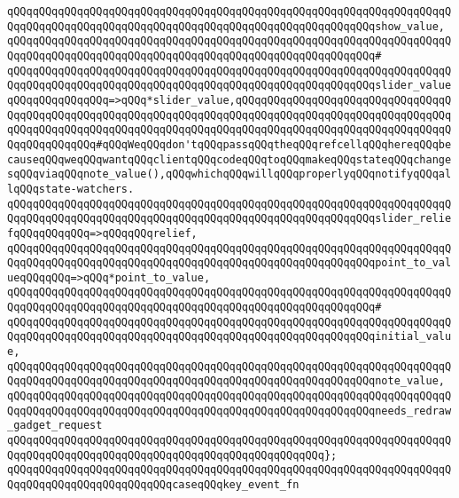 \verb|qQQqqQQqqQQqqQQqqQQqqQQqqQQqqQQqqQQqqQQqqQQqqQQqqQQqqQQqqQQqqQQqqQQqqQQqqQQqqQQqqQQqqQQqqQQqqQQqqQQqqQQqqQQqqQQqqQQqqQQqqQQqqQQqshow_value,|\newline
\verb|qQQqqQQqqQQqqQQqqQQqqQQqqQQqqQQqqQQqqQQqqQQqqQQqqQQqqQQqqQQqqQQqqQQqqQQqqQQqqQQqqQQqqQQqqQQqqQQqqQQqqQQqqQQqqQQqqQQqqQQqqQQqqQQq#|\newline
\verb|qQQqqQQqqQQqqQQqqQQqqQQqqQQqqQQqqQQqqQQqqQQqqQQqqQQqqQQqqQQqqQQqqQQqqQQqqQQqqQQqqQQqqQQqqQQqqQQqqQQqqQQqqQQqqQQqqQQqqQQqqQQqqQQqslider_valueqQQqqQQqqQQqqQQq=>qQQq*slider_value,qQQqqQQqqQQqqQQqqQQqqQQqqQQqqQQqqQQqqQQqqQQqqQQqqQQqqQQqqQQqqQQqqQQqqQQqqQQqqQQqqQQqqQQqqQQqqQQqqQQqqQQqqQQqqQQqqQQqqQQqqQQqqQQqqQQqqQQqqQQqqQQqqQQqqQQqqQQqqQQqqQQqqQQqqQQqqQQqqQQqqQQqqQQq#qQQqWeqQQqdon'tqQQqpassqQQqtheqQQqrefcellqQQqhereqQQqbecauseqQQqweqQQqwantqQQqclientqQQqcodeqQQqtoqQQqmakeqQQqstateqQQqchangesqQQqviaqQQqnote_value(),qQQqwhichqQQqwillqQQqproperlyqQQqnotifyqQQqallqQQqstate-watchers.|\newline
\verb|qQQqqQQqqQQqqQQqqQQqqQQqqQQqqQQqqQQqqQQqqQQqqQQqqQQqqQQqqQQqqQQqqQQqqQQqqQQqqQQqqQQqqQQqqQQqqQQqqQQqqQQqqQQqqQQqqQQqqQQqqQQqqQQqslider_reliefqQQqqQQqqQQq=>qQQqqQQqrelief,|\newline
\verb|qQQqqQQqqQQqqQQqqQQqqQQqqQQqqQQqqQQqqQQqqQQqqQQqqQQqqQQqqQQqqQQqqQQqqQQqqQQqqQQqqQQqqQQqqQQqqQQqqQQqqQQqqQQqqQQqqQQqqQQqqQQqqQQqpoint_to_valueqQQqqQQq=>qQQq*point_to_value,|\newline
\verb|qQQqqQQqqQQqqQQqqQQqqQQqqQQqqQQqqQQqqQQqqQQqqQQqqQQqqQQqqQQqqQQqqQQqqQQqqQQqqQQqqQQqqQQqqQQqqQQqqQQqqQQqqQQqqQQqqQQqqQQqqQQqqQQq#|\newline
\verb|qQQqqQQqqQQqqQQqqQQqqQQqqQQqqQQqqQQqqQQqqQQqqQQqqQQqqQQqqQQqqQQqqQQqqQQqqQQqqQQqqQQqqQQqqQQqqQQqqQQqqQQqqQQqqQQqqQQqqQQqqQQqqQQqinitial_value,|\newline
\verb|qQQqqQQqqQQqqQQqqQQqqQQqqQQqqQQqqQQqqQQqqQQqqQQqqQQqqQQqqQQqqQQqqQQqqQQqqQQqqQQqqQQqqQQqqQQqqQQqqQQqqQQqqQQqqQQqqQQqqQQqqQQqqQQqnote_value,|\newline
\verb|qQQqqQQqqQQqqQQqqQQqqQQqqQQqqQQqqQQqqQQqqQQqqQQqqQQqqQQqqQQqqQQqqQQqqQQqqQQqqQQqqQQqqQQqqQQqqQQqqQQqqQQqqQQqqQQqqQQqqQQqqQQqqQQqneeds_redraw_gadget_request|\newline
\verb|qQQqqQQqqQQqqQQqqQQqqQQqqQQqqQQqqQQqqQQqqQQqqQQqqQQqqQQqqQQqqQQqqQQqqQQqqQQqqQQqqQQqqQQqqQQqqQQqqQQqqQQqqQQqqQQqqQQqqQQq};|\newline
\newline
\verb|qQQqqQQqqQQqqQQqqQQqqQQqqQQqqQQqqQQqqQQqqQQqqQQqqQQqqQQqqQQqqQQqqQQqqQQqqQQqqQQqqQQqqQQqqQQqqQQqcaseqQQqkey_event_fn|\newline
